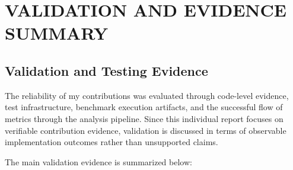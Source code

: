 \chapter{VALIDATION AND EVIDENCE SUMMARY}

\section{Validation and Testing Evidence}

The reliability of my contributions was evaluated through code-level evidence, test infrastructure, benchmark execution artifacts, and the successful flow of metrics through the analysis pipeline. Since this individual report focuses on verifiable contribution evidence, validation is discussed in terms of observable implementation outcomes rather than unsupported claims.

The main validation evidence is summarized below:

